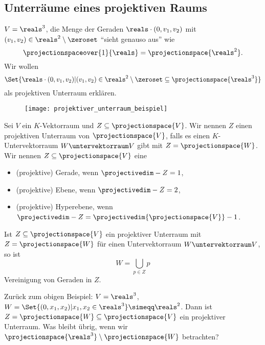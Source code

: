 \subsection*{Unterräume eines projektiven Raums}
\begin{beispiel}\label{projektive_unterebene}
  \( V=\reals^3 \), die Menge der Geraden \( \reals\cdot(0,v_1,v_2) \) mit \( (v_1,v_2)\in \reals^2\setminus\zeroset \) \enquote{sieht genauso aus} wie
  \begin{equation*}
    \projectionspaceover{1}{\reals}=\projectionspace{\reals^2}.
  \end{equation*}
  Wir wollen
  \begin{equation*}
    \Set{\reals\cdot (0,v_1,v_2)|(v_1,v_2)\in \reals^2\setminus\zeroset\subseteq \projectionspace{\reals^3}}
  \end{equation*}
  als projektiven Unterraum erklären.
  \begin{figure}[H]
    \centering
    \texttt{[image: projektiver\_unterraum\_beispiel]}
    \label{fig:projektiver_unterraum_beispiel}
  \end{figure}
\end{beispiel}
\begin{definition*}
  Sei \( V \) ein \( K \)-Vektorraum und \( Z\subseteq \projectionspace{V} \). Wir nennen \( Z \) einen projektiven Unterraum von \( \projectionspace{V} \), falls es einen \( K \)-Untervektorraum \( W\untervektorraum V \) gibt mit \( Z=\projectionspace{W} \). Wir nennen \( Z\subseteq \projectionspace{V} \) eine
  \begin{itemize}
    \item (projektive) Gerade, wenn \( \projectivedim-{Z}=1 \),
    \item (projektive) Ebene, wenn  \( \projectivedim-{Z}=2 \),
    \item (projektive) Hyperebene, wenn \( \projectivedim-{Z}=\projectivedim{\projectionspace{V}}-1 \).
  \end{itemize}
\end{definition*}
\begin{bemerkung*}
  Ist \( Z\subseteq \projectionspace{V} \) ein projektiver Unterraum mit \( Z=\projectionspace{W} \) für einen Untervektorraum \( W\untervektorraum V\), so ist
  \begin{equation*}
    W=\bigcup_{p\in Z} p
  \end{equation*}
  Vereinigung von Geraden in \( Z \).
\end{bemerkung*}
Zurück zum obigen Beispiel: \( V=\reals^3 \), \( W=\Set{(0,x_1,x_2)|x_1,x_2\in\reals^3}\simeqq \reals^2 \). Dann ist \( Z=\projectionspace{W}\subseteq \projectionspace{V} \) ein projektiver Unterraum. Was bleibt übrig, wenn wir \( \projectionspace{\reals^3}\setminus\projectionspace{W} \) betrachten?
